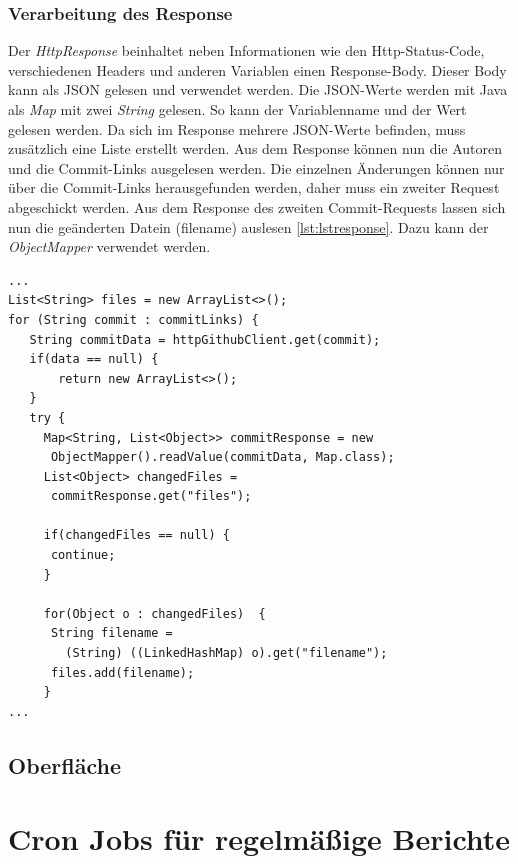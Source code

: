\subsubsection{Verarbeitung des Response}
Der \textit{HttpResponse} beinhaltet neben Informationen wie den Http-Status-Code, verschiedenen Headers und anderen Variablen einen Response-Body. Dieser Body kann als JSON gelesen und verwendet werden. Die JSON-Werte werden mit Java als \textit{Map} mit zwei \textit{String} gelesen. So kann der Variablenname und der Wert gelesen werden. Da sich im Response mehrere JSON-Werte befinden, muss zusätzlich eine Liste erstellt werden. Aus dem Response können nun die Autoren und die Commit-Links ausgelesen werden. Die einzelnen Änderungen können nur über die Commit-Links herausgefunden werden, daher muss ein zweiter Request abgeschickt werden. Aus dem Response des zweiten Commit-Requests lassen sich nun die geänderten Datein (filename) auslesen \ref{lst:lstresponse}. Dazu kann der \textit{ObjectMapper} verwendet werden.
\lstset{
  caption=[Auslesen der geänderten Files aus der Github-API.]{Auslesen der geänderten Files aus der Github-API. Die Links für die Commits müssen in einem eigenen Request vom Repository ausgelesen werden.}, 
  basicstyle=\small\ttfamily, 
  label=lst:lstresponse, 
  language=Java,
  frame=single,
  breaklines=true, %
  postbreak=\mbox{\textcolor{red}{$\hookrightarrow$}\space},
}
\begin{samepage}%
	\begin{lstlisting}[float=tbhp]
...
List<String> files = new ArrayList<>();
for (String commit : commitLinks) {
   String commitData = httpGithubClient.get(commit);
   if(data == null) {
       return new ArrayList<>();
   }
   try {
     Map<String, List<Object>> commitResponse = new   
      ObjectMapper().readValue(commitData, Map.class);
     List<Object> changedFiles = 
      commitResponse.get("files");

     if(changedFiles == null) {
      continue;
     }

     for(Object o : changedFiles)  {
      String filename = 
        (String) ((LinkedHashMap) o).get("filename");
      files.add(filename);
     }
...     
	\end{lstlisting}
\end{samepage}
\subsection{Oberfläche}
\section{Cron Jobs für regelmäßige Berichte}
\chapterend